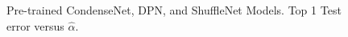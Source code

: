 \begin{figure}[!htb]
{       \label{fig:dpn-net}
   }
   \caption{
      Pre-trained 
      CondenseNet, DPN, and ShuffleNet
      Models.
      Top 1 Test error versus
      $\hat{\alpha}$.
           }
   \label{fig:still_more_1}
\end{figure}


